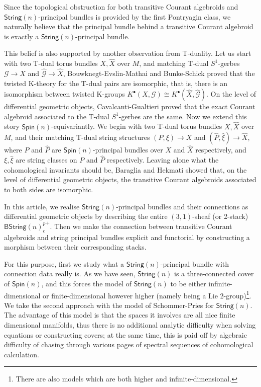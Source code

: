 \documentclass[letterpaper,10pt, oneside]{article} %
\newcommand{\bstringnpp}{{\mathsf{BString}(n)^p_{c}}^+} %
\newcommand{\String}{\mathsf{String}}%
\newcommand{\Spin}{\mathsf{Spin}}%
\begin{document}
Since the topological obstruction for both transitive Courant algebroids and $\String(n)$-principal bundles is provided by the first Pontryagin class, we naturally believe that the principal bundle behind a transitive Courant algebroid is exactly a $\String(n)$-principal bundle.

This belief is also supported by another observation from T-duality. Let us start with two T-dual torus bundles $X, \hat{X}$ over $M$, and matching T-dual $S^1$-gerbes $\mathcal{G}\to X$ and $\hat{\mathcal{G}} \to \hat{X}$, %
 Bouwknegt-Evslin-Mathai \cite{bem2004} and Bunke-Schick \cite{bs2005}
 proved that the twisted K-theory for the T-dual pairs are isomorphic,
 that is,  there is an isomorphism between twisted K-groups $
 K^\bullet(X, \mathcal{G}) \cong K^{\bullet } (\hat{X}, \hat{ \mathcal{G}})$.  On the level of differential geometric objects,  Cavalcanti-Gualtieri \cite{CG} proved that the exact Courant algebroid associated to the T-dual $S^1$-gerbes are the same. Now we extend this story $\Spin(n)$-equivariantly.  We  begin with two T-dual torus bundles $X, \hat{X}$ over $M$, and their matching T-dual string structures $(P, \xi)\to X$ and $(\hat{P}, \hat{\xi}) \to \hat{X}$, where $P$ and $\hat{P}$ are $\Spin(n)$-principal bundles over $X$ and $\hat{X}$ respectively, and $\xi,\hat{\xi}$ are string classes on $P$ and $\hat{P}$ respectively. Leaving alone what the cohomological invariants should be, Baraglia and Hekmati \cite{baraglia-hekmati}  showed that, on the level of differential geometric objects, the transitive Courant algebroids associated to both sides are isomorphic.



In this article, we realise $\String(n)$-principal bundles and their connections as differential geometric objects by describing the entire $(3,1)$-sheaf (or 2-stack) $\bstringnpp$. Then we make the connection between transitive Courant algebroids and string principal bundles explicit and functorial by constructing a morphism between their corresponding stacks.


For this purpose, first we study what a $\String(n)$-principal bundle with connection data really is. As we have seen, $\String(n)$ is a three-connected cover of $\Spin(n)$, and this forces the model of $\String(n)$ to be either infinite-dimensional or finite-dimensional however higher (namely being a Lie 2-group)\footnote{There are also models which are both higher and infinite-dimensional.}. We take the second approach with the model of Schommer-Pries \cite{schommer-pries:string} for $\String(n)$. The advantage of this model is that the spaces it involves are all nice finite dimensional manifolds, thus there is no additional analytic difficulty when solving equations or constructing covers; at the same time, this is paid off by algebraic difficulty of chasing through various pages of spectral sequences of cohomological calculation.
\end{document}
